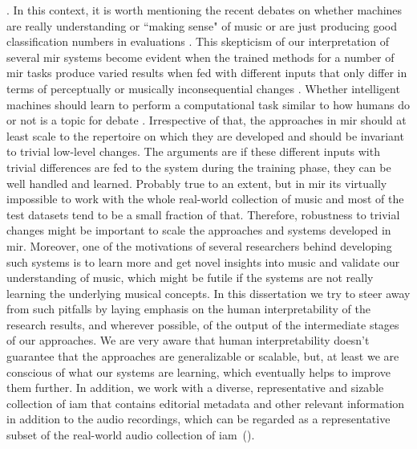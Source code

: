 . In this context, it is worth mentioning the recent debates on whether machines are really understanding or ``making sense" of music or are just producing good classification numbers in evaluations . This skepticism of our interpretation of several \gls{mir} systems become evident when the trained methods for a number of \gls{mir} tasks produce varied results when fed with different inputs that only differ in terms of perceptually or musically inconsequential changes . Whether intelligent machines should learn to perform a computational task similar to how humans do or not is a topic for debate . Irrespective of that, the approaches in \gls{mir} should at least scale to the repertoire on which they are developed and should be invariant to trivial low-level changes. The arguments are if these different inputs with trivial differences are fed to the system during the training phase, they can be well handled and learned. Probably true to an extent, but in \gls{mir} its virtually impossible to work with the whole real-world collection of music and most of the test datasets tend to be a small fraction of that. Therefore, robustness to trivial changes might be important to scale the approaches and systems developed in \gls{mir}. Moreover, one of the motivations of several researchers behind developing such systems is to learn more and get novel insights into music and validate our understanding of music, which might be futile if the systems are not really learning the underlying musical concepts. In this dissertation we try to steer away from such pitfalls by laying emphasis on the human interpretability of the research results, and wherever possible, of the output of the intermediate stages of our approaches. We are very aware that human interpretability doesn't guarantee that the approaches are generalizable or scalable, but, at least we are conscious of what our systems are learning, which eventually helps to improve them further. In addition, we work with a diverse, representative and sizable collection of \gls{iam} that contains editorial metadata and other relevant information in addition to the audio recordings, which can be regarded as a representative subset of the real-world audio collection of \gls{iam}~().

%

